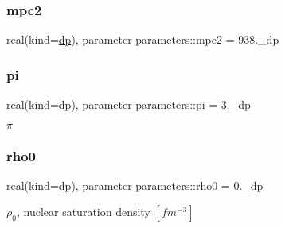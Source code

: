 \mbox{\label{group__CONSTANTS_ga2e354d662a28a3a09a9819c54f818dab}} 
\subsubsection{\texorpdfstring{mpc2}{mpc2}}
{\footnotesize\ttfamily real(kind=\mbox{\hyperlink{namespaceparameters_a52f8c6351fd79345d8811e065bcbbb37}{dp}}), parameter parameters\+::mpc2 = 938.\+\_\+dp}

\mbox{\label{group__CONSTANTS_ga399aac088b57a76a8a5a3784448ba3cf}} 
\subsubsection{\texorpdfstring{pi}{pi}}
{\footnotesize\ttfamily real(kind=\mbox{\hyperlink{namespaceparameters_a52f8c6351fd79345d8811e065bcbbb37}{dp}}), parameter parameters\+::pi = 3.\+\_\+dp}



$\pi$ 

\mbox{\label{group__CONSTANTS_ga0796781a51dc993c4b563f7ac404c641}} 
\subsubsection{\texorpdfstring{rho0}{rho0}}
{\footnotesize\ttfamily real(kind=\mbox{\hyperlink{namespaceparameters_a52f8c6351fd79345d8811e065bcbbb37}{dp}}), parameter parameters\+::rho0 = 0.\+\_\+dp}



$\rho_0$, nuclear saturation density $[fm^{-3}]$ 

